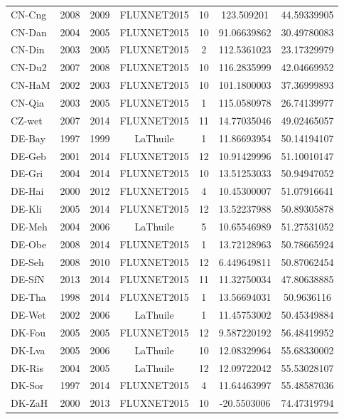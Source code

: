\begin{center}
\begin{longtable}{lcccccc}
CN-Cng & 2008 & 2009 & FLUXNET2015 & 10     & 123.509201   & 44.59339905  \\
CN-Dan & 2004 & 2005 & FLUXNET2015 & 10     & 91.06639862  & 30.49780083  \\
CN-Din & 2003 & 2005 & FLUXNET2015 & 2      & 112.5361023  & 23.17329979  \\
CN-Du2 & 2007 & 2008 & FLUXNET2015 & 10     & 116.2835999  & 42.04669952  \\
CN-HaM & 2002 & 2003 & FLUXNET2015 & 10     & 101.1800003  & 37.36999893  \\
CN-Qia & 2003 & 2005 & FLUXNET2015 & 1      & 115.0580978  & 26.74139977  \\
CZ-wet & 2007 & 2014 & FLUXNET2015 & 11     & 14.77035046  & 49.02465057  \\
DE-Bay & 1997 & 1999 & LaThuile    & 1      & 11.86693954  & 50.14194107  \\
DE-Geb & 2001 & 2014 & FLUXNET2015 & 12     & 10.91429996  & 51.10010147  \\
DE-Gri & 2004 & 2014 & FLUXNET2015 & 10     & 13.51253033  & 50.94947052  \\
DE-Hai & 2000 & 2012 & FLUXNET2015 & 4      & 10.45300007  & 51.07916641  \\
DE-Kli & 2005 & 2014 & FLUXNET2015 & 12     & 13.52237988  & 50.89305878  \\
DE-Meh & 2004 & 2006 & LaThuile    & 5      & 10.65546989  & 51.27531052  \\
DE-Obe & 2008 & 2014 & FLUXNET2015 & 1      & 13.72128963  & 50.78665924  \\
DE-Seh & 2008 & 2010 & FLUXNET2015 & 12     & 6.449649811  & 50.87062454  \\
DE-SfN & 2013 & 2014 & FLUXNET2015 & 11     & 11.32750034  & 47.80638885  \\
DE-Tha & 1998 & 2014 & FLUXNET2015 & 1      & 13.56694031  & 50.9636116   \\
DE-Wet & 2002 & 2006 & LaThuile    & 1      & 11.45753002  & 50.45349884  \\
DK-Fou & 2005 & 2005 & FLUXNET2015 & 12     & 9.587220192  & 56.48419952  \\
DK-Lva & 2005 & 2006 & LaThuile    & 10     & 12.08329964  & 55.68330002  \\
DK-Ris & 2004 & 2005 & LaThuile    & 12     & 12.09722042  & 55.53028107  \\
DK-Sor & 1997 & 2014 & FLUXNET2015 & 4      & 11.64463997  & 55.48587036  \\
DK-ZaH & 2000 & 2013 & FLUXNET2015 & 10     & -20.5503006  & 74.47319794  \\

\end{longtable}
\end{center}
